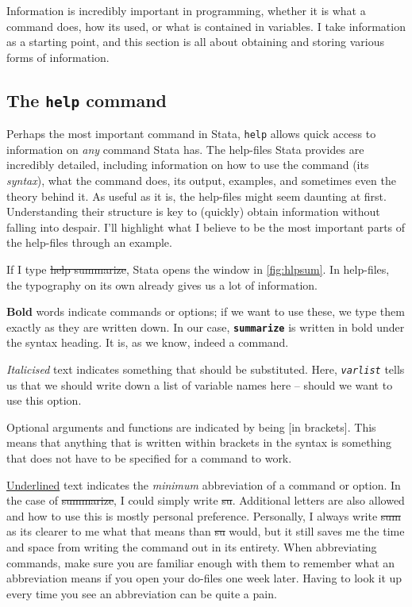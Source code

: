 
Information is incredibly important in programming,
whether it is what a command does, how its used,
or what is contained in variables.
I take information as a starting point,
and this section is all about obtaining and storing various forms of information.


\subsection{The \texttt{help} command}\label{sec:hlp}

Perhaps the most important command in Stata,
\texttt{help} allows quick access to information on \emph{any} command Stata has.
The help-files Stata provides are incredibly detailed,
including information on how to use the command (its \emph{syntax}),
what the command does, its output, examples,
and sometimes even the theory behind it.
As useful as it is, the help-files might seem daunting at first.
Understanding their structure is key to (quickly) obtain information without falling into despair.
I'll highlight what I believe to be the most important parts of the help-files through an example.

If I type \st{help summarize},
Stata opens the window in \cref{fig:hlpsum}.
In help-files, the typography on its own already gives us a lot of information.

\textbf{Bold} words indicate commands or options; if we want to use these,
we type them exactly as they are written down.
In our case,
\textbf{\texttt{summarize}} is written in bold under the syntax heading.
It is, as we know, indeed a command.

\textit{Italicised} text indicates something that should be substituted.
Here, \textit{\texttt{varlist}} tells us that we should write down a list of variable names here -- should we want to use this option.

Optional arguments and functions are indicated by being [in brackets].
This means that anything that is written within brackets in the syntax is something that does not have to be specified for a command to work.

\underline{Underlined} text indicates the \emph{minimum} abbreviation of a command or option.
In the case of \st{summarize},
I could simply write \st{su}.
Additional letters are also allowed and how to use this is mostly personal preference.
Personally, I always write \st{sum} as its clearer to me what that means than \st{su} would,
but it still saves me the time and space from writing the command out in its entirety.
When abbreviating commands,
make sure you are familiar enough with them to remember what an abbreviation means if you open your do-files one week later.
Having to look it up every time you see an abbreviation can be quite a pain.


